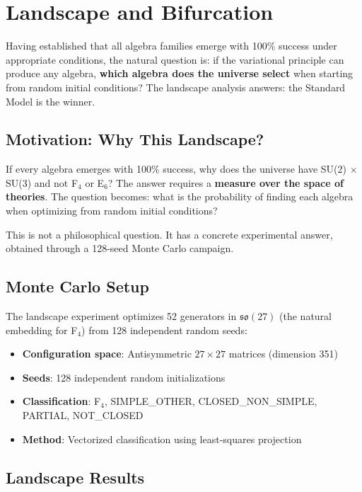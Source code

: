 \section{Landscape and Bifurcation}\label{sec:landscape}

Having established that all algebra families emerge with 100\% success under appropriate conditions, the natural question is: if the variational principle can produce any algebra, \textbf{which algebra does the universe select} when starting from random initial conditions? The landscape analysis answers: the Standard Model is the winner.

\subsection{Motivation: Why This Landscape?}\label{sec:landscape_motivation}

If every algebra emerges with 100\% success, why does the universe have SU(2) $\times$ SU(3) and not F$_4$ or E$_6$? The answer requires a \textbf{measure over the space of theories}. The question becomes: what is the probability of finding each algebra when optimizing from random initial conditions?

This is not a philosophical question. It has a concrete experimental answer, obtained through a 128-seed Monte Carlo campaign.

\subsection{Monte Carlo Setup}\label{sec:mc_setup}

The landscape experiment optimizes 52 generators in $\mathfrak{so}(27)$ (the natural embedding for F$_4$) from 128 independent random seeds:

\begin{itemize}
\item \textbf{Configuration space}: Antisymmetric $27 \times 27$ matrices (dimension 351)
\item \textbf{Seeds}: 128 independent random initializations
\item \textbf{Classification}: F$_4$, SIMPLE\_OTHER, CLOSED\_NON\_SIMPLE, PARTIAL, NOT\_CLOSED
\item \textbf{Method}: Vectorized classification using least-squares projection
\end{itemize}

\subsection{Landscape Results}\label{sec:landscape_results}

